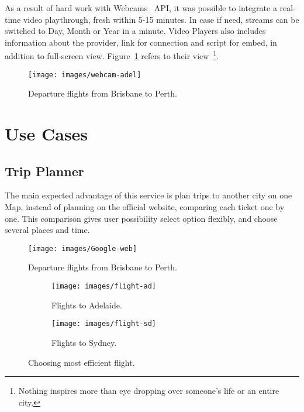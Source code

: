 \documentclass[12pt]{article}
\numberwithin{equation}{section} %
\numberwithin{figure}{section} %
\numberwithin{table}{section} %
\begin{document}
		As a result of hard work with Webcams~\cite{noauthor_webcams.travel_nodate} API, it was possible to integrate a real-time video playthrough, fresh within 5-15 minutes. In case if need, streams can be switched to Day, Month or Year in a minute. Video Players also includes information about the provider, link for connection and script for embed, in addition to full-screen view. Figure~\ref{fig:webCam-adel} refers to their view~\footnote{Nothing inspires more than eye dropping over someone's life or an entire city.}.
		
		\begin{figure}[H]
			\centering        
			\texttt{[image: images/webcam-adel]}
			\caption{Departure flights from Brisbane to Perth.}
			\label{fig:webCam-adel}
		\end{figure}
\newpage		
\section{Use Cases}
	\subsection{Trip Planner}
		The main expected advantage of this service is plan trips to another city on one Map, instead of planning on the official website, comparing each ticket one by one. This comparison gives user possibility select option flexibly, and choose several places and time.
		
		\begin{figure}[H]
			\centering        
			\texttt{[image: images/Google-web]}
			\caption{Departure flights from Brisbane to Perth.}
			\label{fig:webCam}
		\end{figure}
		\begin{figure}[H]
			\begin{subfigure}[b]{0.52\textwidth}
				\centering
				\texttt{[image: images/flight-ad]}
				\caption{Flights to Adelaide.}
				
			\end{subfigure}
			\begin{subfigure}[b]{0.52\textwidth}
				\centering
				\texttt{[image: images/flight-sd]}
				\caption{Flights to Sydney.}
				
			\end{subfigure}
			\caption{Choosing most efficient flight.}
		\end{figure}
\end{document}
